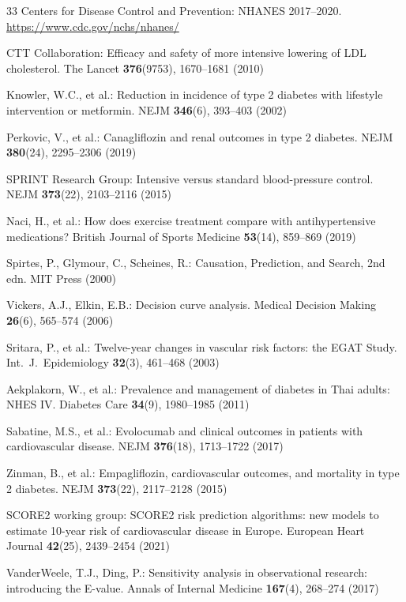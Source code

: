 \documentclass[runningheads]{llncs}
\begin{document}
\begin{thebibliography}{33}
Centers for Disease Control and Prevention:
NHANES 2017--2020.
\url{https://www.cdc.gov/nchs/nhanes/}

CTT Collaboration:
Efficacy and safety of more intensive lowering of LDL cholesterol.
The Lancet \textbf{376}(9753), 1670--1681 (2010)

Knowler, W.C., et al.:
Reduction in incidence of type 2 diabetes with lifestyle intervention or metformin.
NEJM \textbf{346}(6), 393--403 (2002)

Perkovic, V., et al.:
Canagliflozin and renal outcomes in type 2 diabetes.
NEJM \textbf{380}(24), 2295--2306 (2019)

SPRINT Research Group:
Intensive versus standard blood-pressure control.
NEJM \textbf{373}(22), 2103--2116 (2015)

Naci, H., et al.:
How does exercise treatment compare with antihypertensive medications?
British Journal of Sports Medicine \textbf{53}(14), 859--869 (2019)

Spirtes, P., Glymour, C., Scheines, R.:
Causation, Prediction, and Search, 2nd edn.
MIT Press (2000)

Vickers, A.J., Elkin, E.B.:
Decision curve analysis.
Medical Decision Making \textbf{26}(6), 565--574 (2006)

Sritara, P., et al.:
Twelve-year changes in vascular risk factors: the EGAT Study.
Int.\ J.\ Epidemiology \textbf{32}(3), 461--468 (2003)

Aekplakorn, W., et al.:
Prevalence and management of diabetes in Thai adults: NHES IV.
Diabetes Care \textbf{34}(9), 1980--1985 (2011)

Sabatine, M.S., et al.:
Evolocumab and clinical outcomes in patients with cardiovascular disease.
NEJM \textbf{376}(18), 1713--1722 (2017)

Zinman, B., et al.:
Empagliflozin, cardiovascular outcomes, and mortality in type 2 diabetes.
NEJM \textbf{373}(22), 2117--2128 (2015)

SCORE2 working group:
SCORE2 risk prediction algorithms: new models to estimate 10-year risk
of cardiovascular disease in Europe.
European Heart Journal \textbf{42}(25), 2439--2454 (2021)

VanderWeele, T.J., Ding, P.:
Sensitivity analysis in observational research: introducing the E-value.
Annals of Internal Medicine \textbf{167}(4), 268--274 (2017)

\end{thebibliography}
\end{document}
